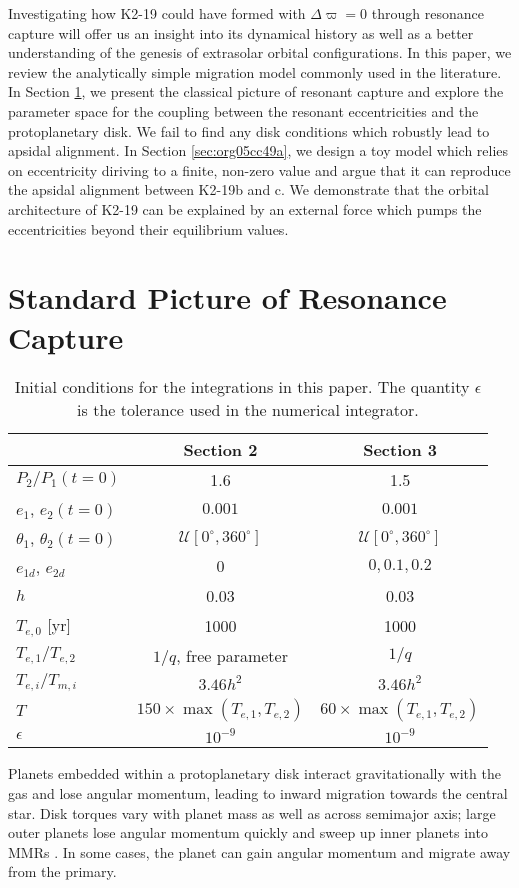 \documentclass[usenatbib]{mnras}
\begin{document}
Investigating how K2-19 could have formed with \(\Delta\varpi=0\)
through resonance capture will offer us an insight into its dynamical
history as well as a better understanding of the genesis of extrasolar
orbital configurations.  In this paper, we review the analytically
simple migration model commonly used in the literature.  In Section
\ref{sec:orgcce68f9}, we present the classical picture of resonant capture
and explore the parameter space for the coupling between the resonant
eccentricities and the protoplanetary disk. We fail to find any disk
conditions which robustly lead to apsidal alignment.  In Section
\ref{sec:org05cc49a}, we design a toy model which relies on eccentricity
diriving to a finite, non-zero value and argue that it can reproduce
the apsidal alignment between K2-19b and c. We demonstrate that the
orbital architecture of K2-19 can be explained by an external force
which pumps the eccentricities beyond their equilibrium values.

\section{Standard Picture of Resonance Capture}
\label{sec:orgcce68f9}
\begin{table}
\caption{\label{tab:ICs}Initial conditions for the integrations in this paper. The quantity \(\epsilon\) is the tolerance used in the numerical integrator.}
\centering
\begin{tabular}{| l | c | c |}
\hline
 & Section 2 & Section 3\\
\hline
\(P_2/P_1 (t=0)\) & 1.6 & 1.5\\
\hline
\(e_1\), \(e_2 (t=0)\) & \(0.001\) & \(0.001\)\\
\hline
\(\theta_1\), \(\theta_2 (t=0)\) & \(\mathcal{U}[0^\circ,360^\circ]\) & \(\mathcal{U}[0^\circ,360^\circ]\)\\
\hline
\(e_{1d}\), \(e_{2d}\) & \(0\) & \(0, 0.1, 0.2\)\\
\hline
\(h\) & 0.03 & 0.03\\
\hline
\(T_{e,0}\) [yr] & 1000 & 1000\\
\hline
\(T_{e,1}/T_{e,2}\) & \(1/q\), free parameter & \(1/q\)\\
\hline
\(T_{e,i}/T_{m,i}\) & \(3.46h^2\) & \(3.46h^2\)\\
\hline
\(T\) & \(150\times\max(T_{e,1},T_{e,2})\) & \(60\times\max(T_{e,1},T_{e,2})\)\\
\hline
\(\epsilon\) & \(10^{-9}\) & \(10^{-9}\)\\
\hline
\end{tabular}
\end{table}
Planets embedded within a protoplanetary disk interact gravitationally
with the gas and lose angular momentum, leading to inward migration
towards the central star.  Disk torques vary with planet mass as well
as across semimajor axis; large outer planets lose angular momentum
quickly and sweep up inner planets into MMRs
\cite{tanaka_three-dimensional_2004,xu_migration_2018}.  In some
cases, the planet can gain angular momentum and migrate away from the
primary.
\end{document}
